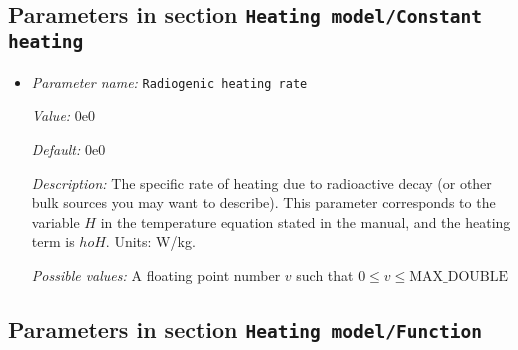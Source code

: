 \subsection{Parameters in section \tt Heating model/Constant heating}
\label{parameters:Heating_20model/Constant_20heating}

\begin{itemize}
\item {\it Parameter name:} {\tt Radiogenic heating rate}
\label{parameters:Heating model/Constant heating/Radiogenic heating rate}


{\it Value:} 0e0


{\it Default:} 0e0


{\it Description:} The specific rate of heating due to radioactive decay (or other bulk sources you may want to describe). This parameter corresponds to the variable $H$ in the temperature equation stated in the manual, and the heating term is $
ho H$. Units: W/kg.


{\it Possible values:} A floating point number $v$ such that $0 \leq v \leq \text{MAX\_DOUBLE}$
\end{itemize}

\subsection{Parameters in section \tt Heating model/Function}
\label{parameters:Heating_20model/Function}

